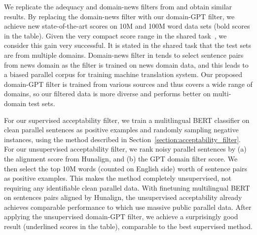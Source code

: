 \documentclass[11pt,a4paper]{article}
\begin{document}
We replicate the adequacy and domain-news filters from \citet{junczys2018dual} and obtain similar results. By replacing the domain-news filter with our domain-GPT filter, we achieve new state-of-the-art scores on 10M and 100M word data sets (bold scores in the table). Given the very compact score range in the shared task~\cite{koehn2018findings}, we consider this gain very successful.
It is stated in the shared task that the test sets are from multiple domains. Domain-news filter in \citet{junczys2018dual} tends to select sentence pairs from news domain as the filter is trained on news domain data, and this leads to a biased parallel corpus for training machine translation system. Our proposed domain-GPT filter is trained from various sources and thus covers a wide range of domains, so our filtered data is more diverse and performs better on multi-domain test sets.

For our supervised acceptability filter, we train a mulitlingual BERT classifier on clean parallel sentences as positive examples and randomly sampling negative instances, using the method described in Section~\ref{section:acceptability_filter}.
For our unsupervised acceptability filter, we rank noisy parallel sentences by (a) the alignment score from Hunalign, and (b) the GPT domain filter score.  We then select the top 10M words (counted on English side) worth of sentence pairs as positive examples. This makes the method completely unsupervised, not requiring any identifiable clean parallel data. With finetuning multilingual BERT on sentences pairs aligned by Hunalign, the unsupervised acceptability already achieves comparable performance to \citet{chaudhary2019low} which use massive public parallel data. After applying the unsupervised domain-GPT filter, we achieve a surprisingly good result (underlined scores in the table), comparable to the best supervised method.
\end{document}
